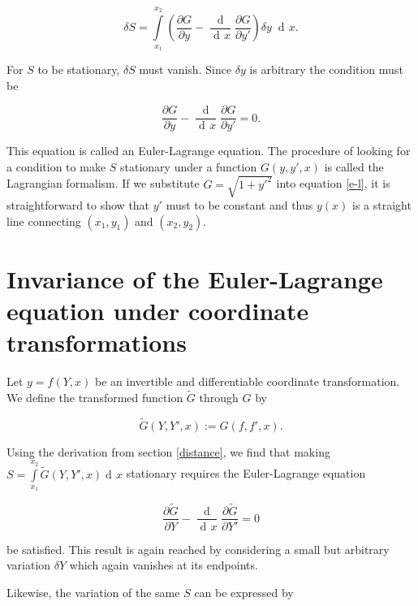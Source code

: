 \documentclass[prb,preprint]{revtex4-1}
\DeclareMathOperator{\dd}{d\!}
\DeclareMathOperator{\ddd}{\mathrm{d}}
\begin{document}
\begin{equation}
\delta S = \int\limits_{x_1}^{x_2} \left( \frac{\partial G}{\partial y}
- \frac{\ddd}{\dd x}\frac{\partial G}{\partial y'} \right) \delta y \; \dd x.
\end{equation}

For $S$ to be stationary, $\delta S$ must vanish. Since $\delta y$ is arbitrary the condition must be


\begin{equation}\label{e-l}
\frac{\partial G}{\partial y} - \frac{\ddd}{\dd x}\frac{\partial G}{\partial y'} = 0.
\end{equation}

This equation is called an Euler-Lagrange equation. The procedure of looking for a condition to make $S$ stationary under a function $G(y,y',x)$ is called the Lagrangian formalism. If we substitute $G = \sqrt{1+y'^2}$ into equation \eqref{e-l}, it is straightforward to show that $y'$ must to be constant and thus $y(x)$ is a straight line connecting $(x_1,y_1)$ and $(x_2,y_2)$.

\section{Invariance of the Euler-Lagrange equation under coordinate transformations \cite{hagen2009path}} \label{invariance}

Let $y=f(Y,x)$ be an invertible and differentiable coordinate transformation. We define the transformed function $\widetilde{G}$ through $G$ by

\begin{equation} \label{lagrangian-transform}
\widetilde{G}(Y,Y',x) := G(f,f',x).
\end{equation}

Using the derivation from section \ref{distance}, we find that making $S = \int\limits_{x_1}^{x_2} \widetilde{G}(Y,Y',x) \dd x$ stationary requires the Euler-Lagrange equation

\begin{equation}
\frac{\partial \widetilde{G}}{\partial Y}
- \frac{\ddd}{\dd x}\frac{\partial \widetilde{G}}{\partial Y'} = 0
\end{equation}

be satisfied. This result is again reached by considering a small but arbitrary variation $\delta Y$ which again vanishes at its endpoints.

Likewise, the variation of the same $S$ can be expressed by
\end{document}
